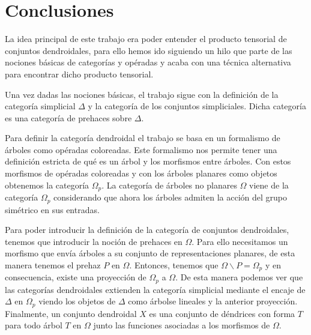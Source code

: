 \documentclass[11pt,a4paper,openright,oneside]{article}
\numberwithin{equation}{section}
\theoremstyle{definition}
\begin{document}


\setcounter{page}{1}



\newpage


\newpage


\newpage


\newpage
\section{Conclusiones}

La idea principal de este trabajo era poder entender el producto tensorial de conjuntos dendroidales, para ello hemos ido siguiendo un hilo que parte de las nociones b\'asicas de categor\'ias y op\'eradas y acaba con una t\'ecnica alternativa para encontrar dicho producto tensorial.

Una vez dadas las nociones b\'asicas, el trabajo sigue con la definici\'on de la categor\'ia simplicial $\Delta$ y la categor\'ia de los conjuntos simpliciales. Dicha categor\'ia es una categor\'ia de prehaces sobre $\Delta$.

Para definir la categor\'ia dendroidal el trabajo se basa en un formalismo de \'arboles como op\'eradas coloreadas. Este formalismo nos permite tener una definici\'on estricta de qu\'e es un \'arbol y los morfismos entre \'arboles.
Con estos morfismos de op\'eradas coloreadas y con los \'arboles planares como objetos obtenemos la categor\'ia $\Omega_p$.
La categor\'ia de \'arboles no planares $\Omega$ viene de la categor\'ia $\Omega_p$ considerando que ahora los \'arboles admiten la acci\'on del grupo sim\'etrico en sus entradas.

Para poder introducir la definici\'on de la categor\'ia de conjuntos dendroidales, tenemos que introducir la noci\'on de prehaces en $\Omega$. Para ello necesitamos un morfismo que env\'ia \'arboles a su conjunto de representaciones planares, de esta manera tenemos el prehaz $P$ en $\Omega$. Entonces, tenemos que $\Omega\backslash P = \Omega_p$ y en consecuencia, existe una proyecci\'on de $\Omega_p$ a $\Omega$.
De esta manera podemos ver que las categor\'ias dendroidales extienden la categor\'ia simplicial mediante el encaje de $\Delta$ en $\Omega_p$ viendo los objetos de $\Delta$ como \'arbolse lineales y la anterior proyecci\'on. 
Finalmente, un conjunto dendroidal $X$ es una conjunto de d\'endrices con forma $T$ para todo \'arbol $T$ en $\Omega$ junto las funciones asociadas a los morfismos de $\Omega$.
\end{document}
